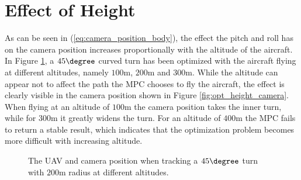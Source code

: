 \section{Effect of Height}

As can be seen in (\ref{eq:camera_position_body}), the effect the pitch and roll has on the camera position increases proportionally with the altitude of the aircraft. In Figure \ref{fig:opt_height}, a $45\degree$ curved turn has been optimized with the aircraft flying at different altitudes, namely $100$m, $200$m and $300$m. While the altitude can appear not to affect the path the MPC chooses to fly the aircraft, the effect is clearly visible in the camera position shown in Figure \ref{fig:opt_height_camera}. When flying at an altitude of $100$m the camera position takes the inner turn, while for $300$m it greatly widens the turn. For an altitude of $400$m the MPC fails to return a stable result, which indicates that the optimization problem becomes more difficult with increasing altitude.

\begin{figure}
	\caption{The UAV and camera position when tracking a $45\degree$ turn with $200$m radius at different altitudes.}
	\label{fig:opt_height}
\end{figure}